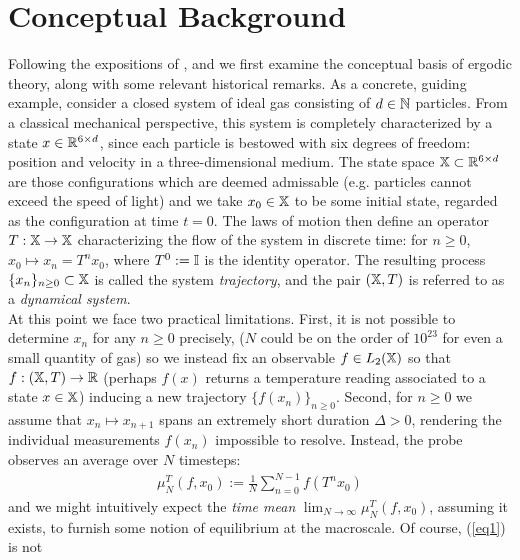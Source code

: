 \documentclass[11pt]{report}
\theoremstyle{definition}
\begin{document}
    \section{Conceptual Background}\label{sec1}
    Following the expositions of \cite[ch.1]{Eisner_Farkas_Haase_Nagel_2015},
    and \cite[ch.2, $\S$5]{Reed_Simon_1972} we first examine the conceptual
    basis of ergodic theory, along with some relevant historical remarks. As a
    concrete, guiding example, consider a closed system of ideal gas consisting
    of $d\in\mathbb{N}$ particles. From a classical mechanical perspective, this
    system is completely characterized by a state $x\in\mathbb{R}^{6\times d}$,
    since each particle is bestowed with six degrees of freedom: position and
    velocity in a three-dimensional medium. The state space
    $\mathbb{X}\subset\mathbb{R}^{6\times d}$ are those configurations which are
    deemed admissable (e.g. particles cannot exceed the speed of light) and we
    take $x_0\in\mathbb{X}$ to be some initial state, regarded as the configuration
    at time $t=0$. The laws of motion then define an operator
    $T:\mathbb{X}\rightarrow\mathbb{X}$ characterizing the flow of the system in
    discrete time: for $n\geq 0$, $x_0\mapsto x_n=T^nx_0$, where $T^0:=\mathbb{I}$
    is the identity operator. The resulting process
    $\{x_n\}_{n\geq0}\subset\mathbb{X}$ is called the system \textit{trajectory},
    and the pair $(\mathbb{X},T)$ is referred to as a \textit{dynamical
    system}.\\[5pt]
    \indent At this point we face two practical limitations. First, it is not
    possible to determine $x_n$ for any $n\geq 0$ precisely, ($N$ could be on
    the order of $10^{23}$ for even a small quantity of gas) so we instead fix
    an observable $f\in L_2(\mathbb{X})$ so that $f:(\mathbb{X},T)\rightarrow\mathbb{R}$
    (perhaps $f(x)$ returns a temperature reading associated to a state
    $x\in\mathbb{X}$) inducing a new trajectory $\{f(x_n)\}_{n\geq 0}$. Second, for
    $n\geq 0$ we assume that $x_n\mapsto x_{n+1}$ spans an extremely short
    duration $\Delta>0$, rendering the individual measurements $f(x_n)$
    impossible to resolve. Instead, the probe observes an average over $N$
    timesteps:
    \begin{align}
        \mu_N^T(f,x_0):=\frac{1}{N}\sum_{n=0}^{N-1}f(T^nx_0)\label{eq1}
    \end{align}
    and we might intuitively expect the \textit{time mean}
    $\lim_{N\rightarrow\infty}\mu^T_N(f,x_0)$, assuming it exists, to furnish
    some notion of equilibrium at the macroscale. Of course, (\ref{eq1}) is not
\end{document}
